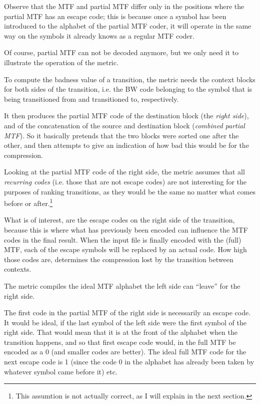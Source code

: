 \documentclass[a4paper]{scrreprt}
\begin{document}
Observe that the MTF and partial MTF differ only in the positions where the
partial MTF has an escape code; this is because once a symbol has been
introduced to the alphabet of the partial MTF coder, it will operate in the same
way on the symbols it already knows as a regular MTF coder.

Of course, partial MTF can not be decoded anymore, but we only need it to
illustrate the operation of the metric.

To compute the badness value of a transition, the metric needs the context
blocks for both sides of the transition, i.e. the BW code belonging to the
symbol that is being transitioned from and transitioned to, respectively.

It then produces the partial MTF code of the destination block (the \emph{right
side}), and of the concatenation of the source and destination block
(\emph{combined partial MTF}). So it  basically pretends that the two blocks
were sorted one after the other, and then attempts to give an indication of how
bad this would be for the compression.

Looking at the partial MTF code of the right side, the metric assumes that all
\emph{recurring codes} (i.e. those that are not escape codes) are not
interesting for the purposes of ranking transitions, as they would be the same no matter
what comes before or after.\footnote{This assumtion is not actually correct, as
I will explain in the next section.}

What is of interest, are the escape codes on the right side of the transition,
because this is where what has previously been encoded can influence the MTF
codes in the final result. When the input file is finally encoded with the
(full) MTF, each of the escape symbols will be replaced by an actual code. How
high those codes are, determines the compression lost by the transition between
contexts.

The metric compiles the ideal MTF alphabet the left side can ``leave'' for the
right side.

The first code in the partial MTF of the right side is necessarily an escape
code. It would be ideal, if the last symbol of the left side were the first
symbol of the right side. That would mean that it is at the front of the
alphabet when the transition happens, and so that first escape code would, in
the full MTF be encoded as a 0 (and smaller codes are better). The ideal full
MTF code for the next escape code is 1 (since the code 0 in the alphabet has
already been taken by whatever symbol came before it) etc.
\end{document}
